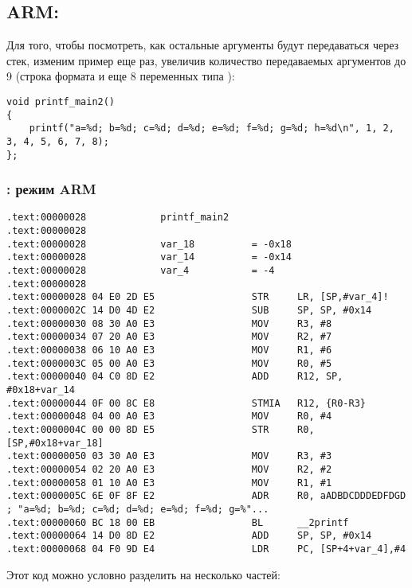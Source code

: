 ﻿\subsection{ARM: }

Для того, чтобы посмотреть, как остальные аргументы будут передаваться через стек, изменим пример еще раз, 
увеличив количество передаваемых аргументов до 9 (строка формата \printf и еще 8 переменных типа \Tint):

\begin{lstlisting}
void printf_main2()
{
	printf("a=%d; b=%d; c=%d; d=%d; e=%d; f=%d; g=%d; h=%d\n", 1, 2, 3, 4, 5, 6, 7, 8);
};
\end{lstlisting}

\subsubsection{\OptimizingKeil: режим ARM}

\begin{lstlisting}
.text:00000028             printf_main2
.text:00000028
.text:00000028             var_18          = -0x18
.text:00000028             var_14          = -0x14
.text:00000028             var_4           = -4
.text:00000028
.text:00000028 04 E0 2D E5                 STR     LR, [SP,#var_4]!
.text:0000002C 14 D0 4D E2                 SUB     SP, SP, #0x14
.text:00000030 08 30 A0 E3                 MOV     R3, #8
.text:00000034 07 20 A0 E3                 MOV     R2, #7
.text:00000038 06 10 A0 E3                 MOV     R1, #6
.text:0000003C 05 00 A0 E3                 MOV     R0, #5
.text:00000040 04 C0 8D E2                 ADD     R12, SP, #0x18+var_14
.text:00000044 0F 00 8C E8                 STMIA   R12, {R0-R3}
.text:00000048 04 00 A0 E3                 MOV     R0, #4
.text:0000004C 00 00 8D E5                 STR     R0, [SP,#0x18+var_18]
.text:00000050 03 30 A0 E3                 MOV     R3, #3
.text:00000054 02 20 A0 E3                 MOV     R2, #2
.text:00000058 01 10 A0 E3                 MOV     R1, #1
.text:0000005C 6E 0F 8F E2                 ADR     R0, aADBDCDDDEDFDGD ; "a=%d; b=%d; c=%d; d=%d; e=%d; f=%d; g=%"...
.text:00000060 BC 18 00 EB                 BL      __2printf
.text:00000064 14 D0 8D E2                 ADD     SP, SP, #0x14
.text:00000068 04 F0 9D E4                 LDR     PC, [SP+4+var_4],#4
\end{lstlisting}

Этот код можно условно разделить на несколько частей:

